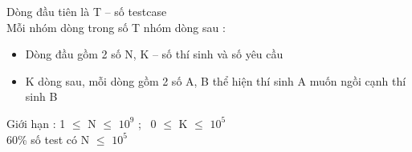 Dòng đầu tiên là T – số testcase
\\Mỗi nhóm dòng trong số T nhóm dòng sau :
\begin{itemize}
	\item Dòng đầu gồm 2 số N, K – số thí sinh và số yêu cầu
	\item K dòng sau, mỗi dòng gồm 2 số A, B thể hiện thí sinh A muốn ngồi cạnh thí sinh B
\end{itemize}

Giới hạn : 1  $\le$  N  $\le$  $10^{9}$ ;  0  $\le$  K  $\le$  $10^{5}$
\\60\% số test có N  $\le$  $10^{5}$